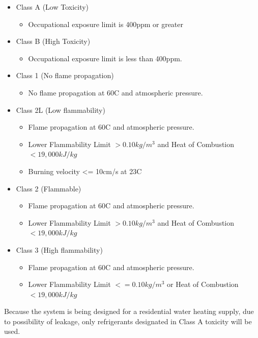 \begin{itemize}[itemsep=3mm, parsep=-1mm]
\item Class A (Low Toxicity)
    \begin{itemize}
        \item Occupational exposure limit is 400ppm or greater
    \end{itemize}
\item Class B (High Toxicity)
    \begin{itemize}
        \item Occupational exposure limit is less than 400ppm.
    \end{itemize}
\item Class 1 (No flame propagation)
    \begin{itemize}
        \item No flame propagation at 60\textdegree C and atmospheric pressure.
    \end{itemize}
\item Class 2L (Low flammability)
    \begin{itemize}
        \item Flame propagation at 60\textdegree C and atmospheric pressure.
        \item Lower Flammability Limit $> 0.10kg/m^3$ and Heat of Combustion $< 19,000 kJ/kg$
        \item Burning velocity <= 10cm/s at 23\textdegree C
    \end{itemize}
\item Class 2 (Flammable)
    \begin{itemize}
        \item Flame propagation at 60\textdegree C and atmospheric pressure.
        \item Lower Flammability Limit $> 0.10kg/m^3$ and Heat of Combustion $< 19,000 kJ/kg$
    \end{itemize}
\item Class 3 (High flammability)
    \begin{itemize}
        \item Flame propagation at 60\textdegree C and atmospheric pressure.
        \item Lower Flammability Limit $<= 0.10kg/m^3$ or Heat of Combustion $< 19,000 kJ/kg$
    \end{itemize}
\end{itemize}

\medskip
Because the system is being designed for a residential water heating supply, due to possibility of leakage, only refrigerants designated in Class A toxicity will be used.

